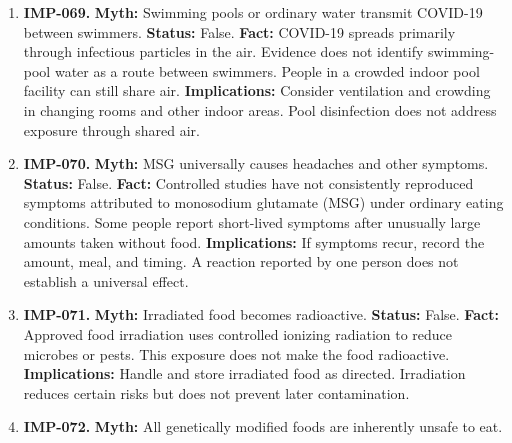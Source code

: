 \documentclass[11pt,oneside]{book}
\begin{document}
\begin{enumerate}[leftmargin=0pt,labelwidth=0pt,labelsep=0pt,itemindent=0pt]
\textbf{Fact:} Clinical evidence has not established vitamin D, vitamin C, or zinc supplements as cures for COVID-19. Treating a documented deficiency is a separate medical indication. \cite{ref420,ref391}\newline
\textbf{Implications:} If you are at higher risk for severe illness, seek timely advice about antiviral treatment. Relying on supplements can use up the short window for starting it.
\item[] \textbf{IMP-069.} \textbf{Myth:} Swimming pools or ordinary water transmit COVID-19 between swimmers.\newline
\textbf{Status:} False.\newline
\textbf{Fact:} COVID-19 spreads primarily through infectious particles in the air. Evidence does not identify swimming-pool water as a route between swimmers. People in a crowded indoor pool facility can still share air. \cite{ref421}\newline
\textbf{Implications:} Consider ventilation and crowding in changing rooms and other indoor areas. Pool disinfection does not address exposure through shared air.
\item[] \textbf{IMP-070.} \textbf{Myth:} MSG universally causes headaches and other symptoms.\newline
\textbf{Status:} False.\newline
\textbf{Fact:} Controlled studies have not consistently reproduced symptoms attributed to monosodium glutamate (MSG) under ordinary eating conditions. Some people report short-lived symptoms after unusually large amounts taken without food. \cite{ref55}\newline
\textbf{Implications:} If symptoms recur, record the amount, meal, and timing. A reaction reported by one person does not establish a universal effect.
\item[] \textbf{IMP-071.} \textbf{Myth:} Irradiated food becomes radioactive.\newline
\textbf{Status:} False.\newline
\textbf{Fact:} Approved food irradiation uses controlled ionizing radiation to reduce microbes or pests. This exposure does not make the food radioactive. \cite{ref56}\newline
\textbf{Implications:} Handle and store irradiated food as directed. Irradiation reduces certain risks but does not prevent later contamination.
\item[] \textbf{IMP-072.} \textbf{Myth:} All genetically modified foods are inherently unsafe to eat.\newline

\end{enumerate}
\end{document}

